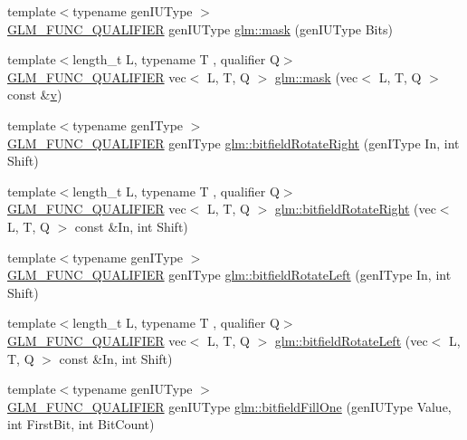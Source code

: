 \begin{DoxyCompactItemize}
\item 
{\footnotesize template$<$typename gen\+I\+U\+Type $>$ }\\\hyperlink{setup_8hpp_a33fdea6f91c5f834105f7415e2a64407}{G\+L\+M\+\_\+\+F\+U\+N\+C\+\_\+\+Q\+U\+A\+L\+I\+F\+I\+ER} gen\+I\+U\+Type \hyperlink{group__gtc__bitfield_gad7eba518a0b71662114571ee76939f8a}{glm\+::mask} (gen\+I\+U\+Type Bits)
\item 
{\footnotesize template$<$length\+\_\+t L, typename T , qualifier Q$>$ }\\\hyperlink{setup_8hpp_a33fdea6f91c5f834105f7415e2a64407}{G\+L\+M\+\_\+\+F\+U\+N\+C\+\_\+\+Q\+U\+A\+L\+I\+F\+I\+ER} vec$<$ L, T, Q $>$ \hyperlink{group__gtc__bitfield_ga2e64e3b922a296033b825311e7f5fff1}{glm\+::mask} (vec$<$ L, T, Q $>$ const \&\hyperlink{_s_d_l__opengl_8h_a10a82eabcb59d2fcd74acee063775f90}{v})
\item 
{\footnotesize template$<$typename gen\+I\+Type $>$ }\\\hyperlink{setup_8hpp_a33fdea6f91c5f834105f7415e2a64407}{G\+L\+M\+\_\+\+F\+U\+N\+C\+\_\+\+Q\+U\+A\+L\+I\+F\+I\+ER} gen\+I\+Type \hyperlink{namespaceglm_a29f065281c52cf3ca7695e71504687fc}{glm\+::bitfield\+Rotate\+Right} (gen\+I\+Type In, int Shift)
\item 
{\footnotesize template$<$length\+\_\+t L, typename T , qualifier Q$>$ }\\\hyperlink{setup_8hpp_a33fdea6f91c5f834105f7415e2a64407}{G\+L\+M\+\_\+\+F\+U\+N\+C\+\_\+\+Q\+U\+A\+L\+I\+F\+I\+ER} vec$<$ L, T, Q $>$ \hyperlink{group__gtc__bitfield_ga590488e1fc00a6cfe5d3bcaf93fbfe88}{glm\+::bitfield\+Rotate\+Right} (vec$<$ L, T, Q $>$ const \&In, int Shift)
\item 
{\footnotesize template$<$typename gen\+I\+Type $>$ }\\\hyperlink{setup_8hpp_a33fdea6f91c5f834105f7415e2a64407}{G\+L\+M\+\_\+\+F\+U\+N\+C\+\_\+\+Q\+U\+A\+L\+I\+F\+I\+ER} gen\+I\+Type \hyperlink{namespaceglm_ae088d9983f8cb8fcf0aacae4ae51462a}{glm\+::bitfield\+Rotate\+Left} (gen\+I\+Type In, int Shift)
\item 
{\footnotesize template$<$length\+\_\+t L, typename T , qualifier Q$>$ }\\\hyperlink{setup_8hpp_a33fdea6f91c5f834105f7415e2a64407}{G\+L\+M\+\_\+\+F\+U\+N\+C\+\_\+\+Q\+U\+A\+L\+I\+F\+I\+ER} vec$<$ L, T, Q $>$ \hyperlink{group__gtc__bitfield_gae186317091b1a39214ebf79008d44a1e}{glm\+::bitfield\+Rotate\+Left} (vec$<$ L, T, Q $>$ const \&In, int Shift)
\item 
{\footnotesize template$<$typename gen\+I\+U\+Type $>$ }\\\hyperlink{setup_8hpp_a33fdea6f91c5f834105f7415e2a64407}{G\+L\+M\+\_\+\+F\+U\+N\+C\+\_\+\+Q\+U\+A\+L\+I\+F\+I\+ER} gen\+I\+U\+Type \hyperlink{group__gtc__bitfield_ga46f9295abe3b5c7658f5b13c7f819f0a}{glm\+::bitfield\+Fill\+One} (gen\+I\+U\+Type Value, int First\+Bit, int Bit\+Count)

\end{DoxyCompactItemize}
